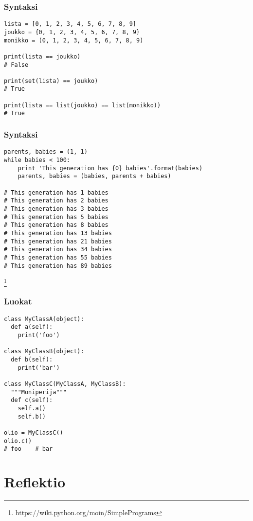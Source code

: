 \documentclass{beamer}
\newcommand\blfootnote[1]{%
  \begingroup
  \renewcommand\thefootnote{}\footnote{#1}%
  \addtocounter{footnote}{-1}%
  \endgroup
}
\begin{document}
\begin{frame}[fragile]
\frametitle{Syntaksi}
\begin{verbatim}
lista = [0, 1, 2, 3, 4, 5, 6, 7, 8, 9]
joukko = {0, 1, 2, 3, 4, 5, 6, 7, 8, 9}
monikko = (0, 1, 2, 3, 4, 5, 6, 7, 8, 9)

print(lista == joukko)
# False

print(set(lista) == joukko)
# True

print(lista == list(joukko) == list(monikko))
# True
\end{verbatim}
\end{frame}


\begin{frame}[fragile]
\frametitle{Syntaksi}
\begin{verbatim}
parents, babies = (1, 1)
while babies < 100:
    print 'This generation has {0} babies'.format(babies)
    parents, babies = (babies, parents + babies)

# This generation has 1 babies
# This generation has 2 babies
# This generation has 3 babies
# This generation has 5 babies
# This generation has 8 babies
# This generation has 13 babies
# This generation has 21 babies
# This generation has 34 babies
# This generation has 55 babies
# This generation has 89 babies
\end{verbatim}
\blfootnote{https://wiki.python.org/moin/SimplePrograms}
\end{frame}




\begin{frame}[fragile]
\frametitle{Luokat}
\begin{verbatim}
class MyClassA(object):
  def a(self):
    print('foo')

class MyClassB(object):
  def b(self):
    print('bar')

class MyClassC(MyClassA, MyClassB):
  """Moniperija"""
  def c(self):
    self.a()
    self.b()

olio = MyClassC()
olio.c()
# foo    # bar
\end{verbatim}
\end{frame}

\section{Reflektio}
\end{document}
